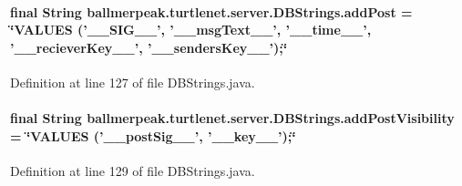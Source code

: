 \hypertarget{classballmerpeak_1_1turtlenet_1_1server_1_1DBStrings_a0fa383a5ec1519c387372722ee41a7fe}{
\paragraph[{add\-Post}]{\setlength{\rightskip}{0pt plus 5cm}final String ballmerpeak.\-turtlenet.\-server.\-D\-B\-Strings.\-add\-Post = \char`\"{}V\-A\-L\-U\-E\-S ('\-\_\-\-\_\-\-S\-I\-G\-\_\-\-\_\-', '\-\_\-\-\_\-msg\-Text\-\_\-\-\_\-', '\-\_\-\-\_\-time\-\_\-\-\_\-', '\-\_\-\-\_\-reciever\-Key\-\_\-\-\_\-', '\-\_\-\-\_\-senders\-Key\-\_\-\-\_\-');\char`\"{}\hspace{0.3cm}{\ttfamily [static]}}}\label{classballmerpeak_1_1turtlenet_1_1server_1_1DBStrings_a0fa383a5ec1519c387372722ee41a7fe}


Definition at line 127 of file D\-B\-Strings.\-java.

\hypertarget{classballmerpeak_1_1turtlenet_1_1server_1_1DBStrings_a3a96505a04038ec4631bbeeb7aa64f4d}{
\paragraph[{add\-Post\-Visibility}]{\setlength{\rightskip}{0pt plus 5cm}final String ballmerpeak.\-turtlenet.\-server.\-D\-B\-Strings.\-add\-Post\-Visibility = \char`\"{}V\-A\-L\-U\-E\-S ('\-\_\-\-\_\-post\-Sig\-\_\-\-\_\-', '\-\_\-\-\_\-key\-\_\-\-\_\-');\char`\"{}\hspace{0.3cm}{\ttfamily [static]}}}\label{classballmerpeak_1_1turtlenet_1_1server_1_1DBStrings_a3a96505a04038ec4631bbeeb7aa64f4d}


Definition at line 129 of file D\-B\-Strings.\-java.

